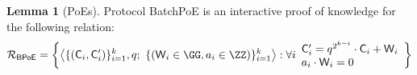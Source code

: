 \documentclass{article}
\theoremstyle{definition}
\newtheorem{lemma}{Lemma}
\begin{document}
	\begin{lemma}[PoEs]
		Protocol \textsf{BatchPoE} is an interactive proof of knowledge for the following relation:
		\[ \mathcal{R_\textsf{BPoE}} = \left\{
\big\langle \{(\gr{C}_i,\gr{C}_i')\}_{i=1}^{\numrounds}, q ; \ \{(\gr{W}_i\in \GG, a_i \in \ZZ)\}_{i=1}^k  \big\rangle
: \forall i
\begin{array}{l} 
 \Commitment_i' = q^{2^{\numrounds-i}}  \cdot \Commitment_i + \gr{W}_i \\ 
a_i\cdot \gr{W}_i=0
\end{array}\right\}
\]


	\end{lemma}
\end{document}
